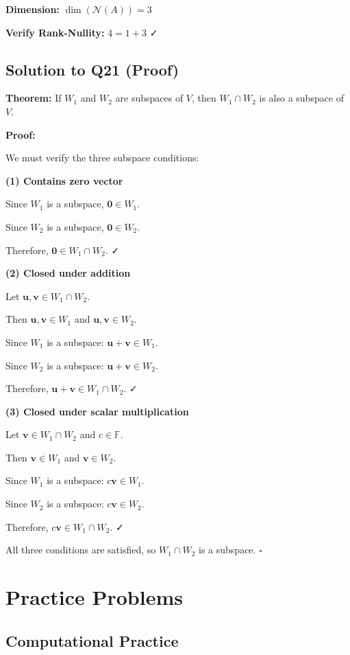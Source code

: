 \documentclass[12pt,a4paper]{article}
\theoremstyle{definition}
\begin{document}
\textbf{Dimension:} $\dim(\mathcal{N}(A)) = 3$

\textbf{Verify Rank-Nullity:} $4 = 1 + 3$ ✓

\subsection{Solution to Q21 (Proof)}

\textbf{Theorem:} If $W_1$ and $W_2$ are subspaces of $V$, then $W_1 \cap W_2$ is also a subspace of $V$.

\textbf{Proof:}

We must verify the three subspace conditions:

\textbf{(1) Contains zero vector}

Since $W_1$ is a subspace, $\mathbf{0} \in W_1$.

Since $W_2$ is a subspace, $\mathbf{0} \in W_2$.

Therefore, $\mathbf{0} \in W_1 \cap W_2$. ✓

\textbf{(2) Closed under addition}

Let $\mathbf{u}, \mathbf{v} \in W_1 \cap W_2$.

Then $\mathbf{u}, \mathbf{v} \in W_1$ and $\mathbf{u}, \mathbf{v} \in W_2$.

Since $W_1$ is a subspace: $\mathbf{u} + \mathbf{v} \in W_1$.

Since $W_2$ is a subspace: $\mathbf{u} + \mathbf{v} \in W_2$.

Therefore, $\mathbf{u} + \mathbf{v} \in W_1 \cap W_2$. ✓

\textbf{(3) Closed under scalar multiplication}

Let $\mathbf{v} \in W_1 \cap W_2$ and $c \in \mathbb{F}$.

Then $\mathbf{v} \in W_1$ and $\mathbf{v} \in W_2$.

Since $W_1$ is a subspace: $c\mathbf{v} \in W_1$.

Since $W_2$ is a subspace: $c\mathbf{v} \in W_2$.

Therefore, $c\mathbf{v} \in W_1 \cap W_2$. ✓

All three conditions are satisfied, so $W_1 \cap W_2$ is a subspace. $\square$

\section{Practice Problems}

\subsection{Computational Practice}
\end{document}
